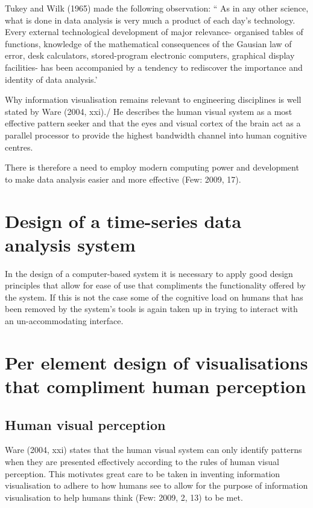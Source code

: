 \documentclass[a4paper,12pt]{article}
\begin{document}
 Tukey and Wilk (1965) made the following observation:
 `` As in any other science, what is done in data analysis is very much a product of each day's technology.
 Every external technological development of major relevance- organised tables of functions, knowledge of the mathematical consequences of
 the Gausian law of error, desk calculators, stored-program electronic computers, graphical display facilities-
 has been accompanied by a tendency to rediscover the importance and identity of data analysis.'

 Why information visualisation remains relevant to engineering disciplines is well stated by Ware (2004, xxi)./
 He describes the human visual system as a most effective pattern seeker and that the eyes and visual cortex of the
 brain act as a parallel processor to provide the highest bandwidth channel into human cognitive centres.

 There is therefore a need to employ modern computing power and development to make data analysis easier and more
 effective (Few: 2009, 17).

 \section{Design of a time-series data analysis system}
 In the design of a computer-based system it is necessary to apply good design principles that allow for ease of use that compliments the
 functionality offered by the system. If this is not the case some of the cognitive load on humans that has been removed by the system's tools
 is again taken up in trying to interact with an un-accommodating interface.

 \section{Per element design of visualisations that compliment human perception}
 \subsection{Human visual perception}
 Ware (2004, xxi) states that the human visual system can only identify patterns when they are presented effectively according to the
rules of human visual perception. This motivates great care to be taken in inventing information visualisation to adhere to how humans
see to allow for the purpose of information visualisation to help humans think (Few: 2009, 2, 13) to be met.
 
\end{document}
